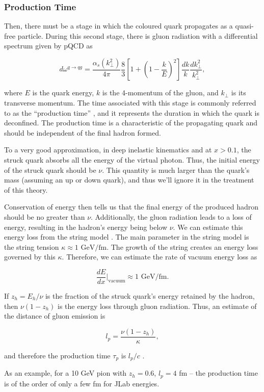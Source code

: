 \subsubsection{Production Time}
\label{10.32::production_time}
    Then, there must be a stage in which the coloured quark propagates as a quasi-free particle.
    During this second stage, there is gluon radiation with a differential spectrum given by pQCD as

    \begin{equation*}
        d\omega^{q \rightarrow qg} =
            \frac{\alpha_s(k_\perp^2)}{4\pi}
            \frac{8}{3}\left[ 1 + \left( 1 - \frac{k}{E} \right)^2 \right]
            \frac{dk}{k} \frac{dk_\perp^2}{k_\perp^2},
    \end{equation*}

    where $E$ is the quark energy, $k$ is the 4-momentum of the gluon, and $k_\perp$ is its transverse momentum.
    The time associated with this stage is commonly referred to as the ``production time'' \cite{kopeliovich2004}, and it represents the duration in which the quark is deconfined.
    The production time is a characteristic of the propagating quark and should be independent of the final hadron formed.

    To a very good approximation, in deep inelastic kinematics and at $x > 0.1$, the struck quark absorbs all the energy of the virtual photon.
    Thus, the initial energy of the struck quark should be $\nu$.
    This quantity is much larger than the quark's mass (assuming an up or down quark), and thus we'll ignore it in the treatment of this theory.

    Conservation of energy then tells us that the final energy of the produced hadron should be no greater than $\nu$.
    Additionally, the gluon radiation leads to a loss of energy, resulting in the hadron's energy being below $\nu$.
    We can estimate this energy loss from the string model \cite{artru1974}.
    The main parameter in the string model is the string tension $\kappa \approx 1 \text{ GeV}/\text{fm}$.
    The growth of the string creates an energy loss governed by this $\kappa$.
    Therefore, we can estimate the rate of vacuum energy loss as

    \begin{equation*}
        \frac{dE}{dx}\Big|_\text{vacuum} \approx 1 \text{ GeV}/\text{fm}.
    \end{equation*}

    If $z_h = E_h/\nu$ is the fraction of the struck quark's energy retained by the hadron, then $\nu(1 - z_h)$ is the energy loss through gluon radiation.
    Thus, an estimate of the distance of gluon emission is

    \begin{equation*}
        l_p = \frac{\nu(1 - z_h)}{\kappa},
    \end{equation*}

    and therefore the production time $\tau_p$ is $l_p/c$ \cite{kopeliovich2004}.

    As an example, for a 10 GeV pion with $z_h = 0.6$, $l_p = 4$ fm -- the production time is of the order of only a few fm for JLab energies.
